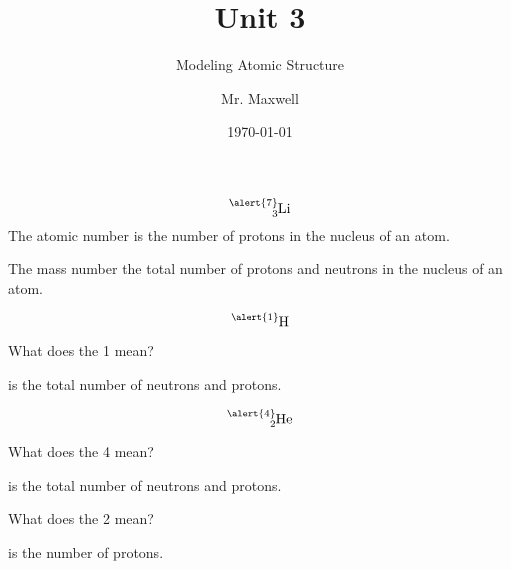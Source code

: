 \documentclass{beamer}
\title{Unit 3}
\subtitle{Modeling Atomic Structure}
\author{Mr. Maxwell}
\institute{PACS}
\date{\today}
\begin{document}
\frame{\titlepage}


\begin{frame}

    $$\ce{^{\alert{7}}_{3}Li}$$
\onslide The 
 \pause \alert{atomic number}
 \onslide is the number of 
 \pause \alert{protons} 
 \onslide in the nucleus of an atom.
\end{frame}


\begin{frame}
    \onslide The 
     \pause \alert{mass number}
     \onslide the total number of
     \pause \alert{protons} 
     \onslide and
     \pause \alert{neutrons} 
     \onslide in the nucleus of an atom.
    \end{frame}

\begin{frame}
    $$\ce{^{\alert{1}}_{}H}$$

    \pause What does the \alert{1} mean?

     is the total number of neutrons and protons.
\end{frame}


\begin{frame}
    $$\ce{^{\alert{4}}_{2}He}$$

    \pause What does the \alert{4} mean?

     is the total number of neutrons and protons.

    \pause What does the \alert{2} mean?

     is the number of protons.
\end{frame}
\end{document}

